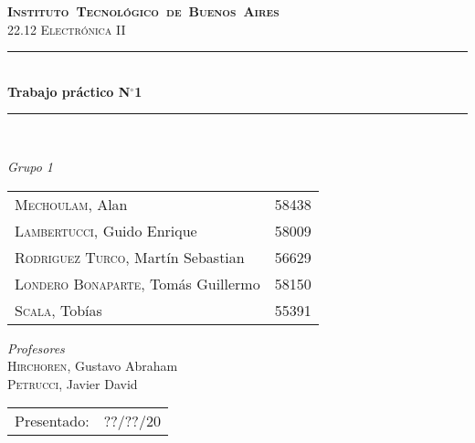 \begin{titlepage}
\newcommand{\HRule}{\rule{\linewidth}{0.5mm}}
\center
\mbox{\textsc{\LARGE \bfseries {Instituto Tecnológico de Buenos Aires}}}\\[1.5cm]
\textsc{\Large 22.12 Electrónica II}\\[0.5cm]


\HRule \\[0.6cm]
{ \Huge \bfseries Trabajo práctico N$^{\circ}$1}\\[0.4cm] 
\HRule \\[1.5cm]


{\large

\emph{Grupo 1}\\
\vspace{3px}

\begin{tabular}{lr} 	
\textsc{Mechoulam}, Alan  &  58438\\
\textsc{Lambertucci}, Guido Enrique  & 58009 \\
\textsc{Rodriguez Turco}, Martín Sebastian  & 56629 \\
\textsc{Londero Bonaparte}, Tomás Guillermo  & 58150 \\
\textsc{Scala}, Tobías & 55391 \\
\end{tabular}

\vspace{20px}

\emph{Profesores}\\
\textsc{Hirchoren}, Gustavo Abraham\\
\textsc{Petrucci}, Javier David\\
\vspace{3px}

\vspace{100px}

\begin{tabular}{ll}

Presentado: & ??/??/20\\

\end{tabular}

}

\vfill

\end{titlepage}
